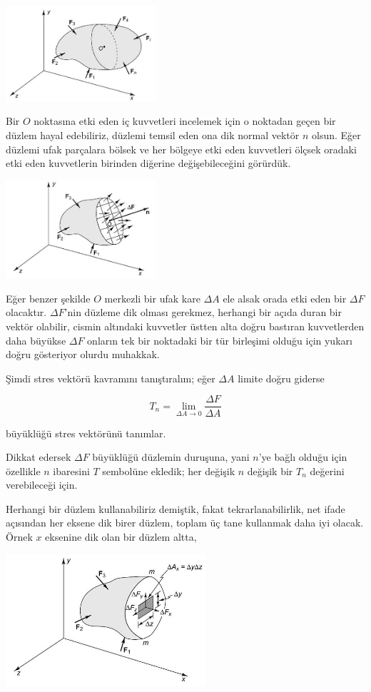 \documentclass[12pt,fleqn]{article}\usepackage{../../common}
\begin{document}
\includegraphics[width=15em]{phy_020_strs_02_16.jpg}

Bir $O$ noktasına etki eden iç kuvvetleri incelemek için o noktadan geçen bir
düzlem hayal edebiliriz, düzlemi temsil eden ona dik normal vektör $n$ olsun.
Eğer düzlemi ufak parçalara bölsek ve her bölgeye etki eden kuvvetleri ölçsek
oradaki etki eden kuvvetlerin birinden diğerine değişebileceğini görürdük.

\includegraphics[width=15em]{phy_020_strs_02_17.jpg}

Eğer benzer şekilde $O$ merkezli bir ufak kare $\Delta A$ ele alsak orada etki
eden bir $\Delta F$ olacaktır. $\Delta F$'nin düzleme dik olması gerekmez,
herhangi bir açıda duran bir vektör olabilir, cismin altındaki kuvvetler üstten
alta doğru bastıran kuvvetlerden daha büyükse $\Delta F$ onların tek bir
noktadaki bir tür birleşimi olduğu için yukarı doğru gösteriyor olurdu muhakkak.

Şimdi stres vektörü kavramını tanıştıralım; eğer $\Delta A$ limite doğru giderse

$$
T_n = \lim_{\Delta A \to 0} \frac{\Delta F}{\Delta A}
$$

büyüklüğü stres vektörünü tanımlar.

Dikkat edersek $\Delta F$ büyüklüğü düzlemin duruşuna, yani $n$'ye bağlı olduğu
için özellikle $n$ ibaresini $T$ sembolüne ekledik; her değişik $n$ değişik bir
$T_n$ değerini verebileceği için.

Herhangi bir düzlem kullanabiliriz demiştik, fakat tekrarlanabilirlik, net ifade
açısından her eksene dik birer düzlem, toplam üç tane kullanmak daha iyi
olacak. Örnek $x$ eksenine dik olan bir düzlem altta,

\includegraphics[width=20em]{phy_020_strs_02_18.jpg}
\end{document}
